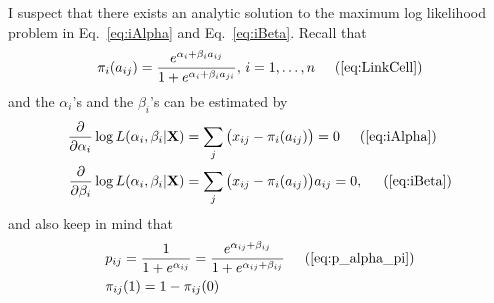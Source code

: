 \documentclass[12pt]{article}
\begin{document}
I suspect that there exists an analytic solution to the maximum log likelihood problem in Eq.~\ref{eq:iAlpha} and  Eq.~\ref{eq:iBeta}.
Recall that
\begin{align*}
  \pi_i(a_{ij}) = \frac{e^{\alpha_{i} + \beta_{i} a_{ij}}}{1 + e^{\alpha_{i} + \beta_{i} a_{ji}}}, \, i = 1, \ldots, n  \hspace{5mm}  (\ref{eq:LinkCell})
\end{align*}
and the $\alpha_{i}$'s and the $\beta_{i}$'s can be estimated by
\begin{align*}
  \frac{\partial}{\partial \alpha_i} \log L(\alpha_i, \beta_i|\mathbf{X}) &= \sum_{j} \big (x_{ij} -\pi_i(a_{ij}) \big ) = 0   \hspace{5mm}  (\ref{eq:iAlpha}) \\
  \frac{\partial}{\partial \beta_i} \log L(\alpha_i, \beta_i|\mathbf{X}) &= \sum_{j}\big  (x_{ij} - \pi_i(a_{ij}) \big )a_{ij} = 0, \hspace{5mm}  (\ref{eq:iBeta})
\end{align*}
and also keep in mind that
\begin{align*}
  & p_{ij} =  \frac{1}{1 + e^{\alpha_{ij}}} =  \frac{e^{\alpha_{ij} + \beta_{ij}}}{1 + e^{\alpha_{ij} + \beta_{ij}}} \hspace{5mm}  (\ref{eq:p_alpha_pi}) \\
  & \pi_{ij}(1)  = 1 - \pi_{ij}(0) \nonumber
\end{align*}




\end{document}
